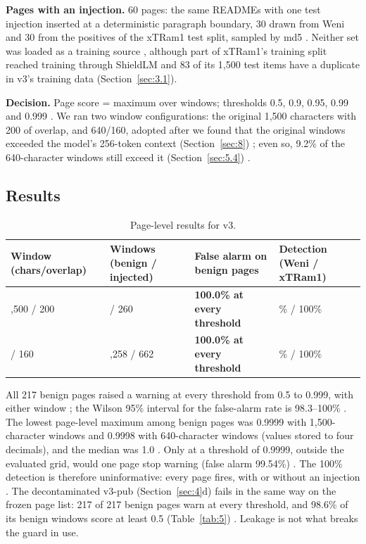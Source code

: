 \documentclass[11pt]{article}
\begin{document}
\textbf{Pages with an injection.} 60 pages: the same READMEs with one test injection inserted at a deterministic paragraph boundary, 30 drawn from Weni and 30 from the positives of the xTRam1 test split, sampled by md5%
. Neither set was loaded as a training source%
, although part of xTRam1's training split reached training through ShieldLM and 83 of its 1,500 test items have a duplicate in v3's training data (Section~\ref{sec:3.1}).

\textbf{Decision.} Page score = maximum over windows; thresholds 0.5, 0.9, 0.95, 0.99 and 0.999%
. We ran two window configurations: the original 1,500 characters with 200 of overlap, and 640/160, adopted after we found that the original windows exceeded the model's 256-token context (Section~\ref{sec:8})%
; even so, 9.2\% of the 640-character windows still exceed it (Section~\ref{sec:5.4})%
.

\subsection{Results}\label{sec:5.2}

\begin{table}[tbp]
\centering
\small
\caption{Page-level results for v3.}\label{tab:6}
\begin{tabularx}{\linewidth}{@{}>{\raggedright\arraybackslash\hsize=0.91\hsize}X>{\raggedright\arraybackslash\hsize=0.82\hsize}X>{\raggedright\arraybackslash\hsize=1.52\hsize}X>{\raggedright\arraybackslash\hsize=0.76\hsize}X@{}}
\toprule
Window (chars/overlap) & Windows (benign / injected) & False alarm on benign pages & Detection (Weni / xTRam1) \\
\midrule
1,500 / 200 & 895 / 260 %
 & \textbf{100.0\% at every threshold} %
 & 100\% / 100\% %
 \\
640 / 160 & 2,258 / 662 %
 & \textbf{100.0\% at every threshold} %
 & 100\% / 100\% %
 \\
\bottomrule
\end{tabularx}
\end{table}

All 217 benign pages raised a warning at every threshold from 0.5 to 0.999, with either window%
; the Wilson 95\% interval for the false-alarm rate is 98.3–100\%%
. The lowest page-level maximum among benign pages was 0.9999 with 1,500-character windows and 0.9998 with 640-character windows (values stored to four decimals), and the median was 1.0%
. Only at a threshold of 0.9999, outside the evaluated grid, would one page stop warning (false alarm 99.54\%)%
. The 100\% detection is therefore uninformative: every page fires, with or without an injection%
. The decontaminated v3-pub (Section~\ref{sec:4}d) fails in the same way on the frozen page list: 217 of 217 benign pages warn at every threshold, and 98.6\% of its benign windows score at least 0.5 (Table~\ref{tab:5})%
. Leakage is not what breaks the guard in use.
\end{document}
